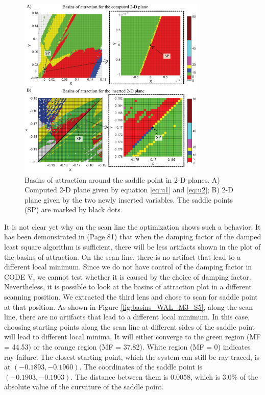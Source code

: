 \begin{figure}[h!]
    \centering
    \includegraphics[width=0.8\textwidth]{chapter-4/figures/Basins_two_situations.png}
    \caption{Basins of attraction around the saddle point in 2-D planes. A) Computed 2-D plane given by equation \ref{eq:u1} and \ref{eq:u2}; B) 2-D plane given by the two newly inserted variables. The saddle points (SP) are marked by black dots.}
    \label{fig:basins}
\end{figure}
It is not clear yet why on the scan line the optimization shows such a behavior. It has been demonstrated in \cite{vanTurnhoutThesis2009} (Page 81) that when the damping factor of the damped least square algorithm is sufficient, there will be less artifacts shown in the plot of the basins of attraction. On the scan line, there is no artifact that lead to a different local minimum. Since we do not have control of the damping factor in CODE V, we cannot test whether it is caused by the choice of damping factor. Nevertheless, it is possible to look at the basins of attraction plot in a different scanning position. We extracted the third lens and chose to scan for saddle point at that position. As shown in Figure \ref{fig:basins_WAL_M3_S5}, along the scan line, there are no artifacts that lead to a different local minimum. In this case, choosing starting points along the scan line at different sides of the saddle point will lead to different local minima. It will either converge to the green region (MF = 44.53) or the orange region (MF = 37.82). White region (MF = 0) indicates ray failure. The closest starting point, which the system can still be ray traced, is at $(-0.1893, -0.1960)$. The coordinates of the saddle point is $(-0.1903, -0.1903)$. The distance between them is $0.0058$, which is $3.0\%$ of the absolute value of the curvature of the saddle point. 

